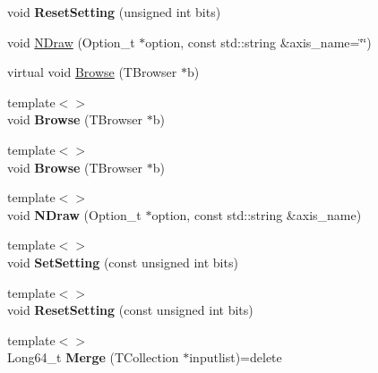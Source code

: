 \begin{DoxyCompactItemize}
void {\bfseries Reset\+Setting} (unsigned int bits)
\item 
void \mbox{\hyperlink{classQn_1_1DataContainer_a146d918368c9ab5273e223fac3bcedf1}{N\+Draw}} (Option\+\_\+t $\ast$option, const std\+::string \&axis\+\_\+name=\char`\"{}\char`\"{})
\item 
virtual void \mbox{\hyperlink{classQn_1_1DataContainer_acb108bdec1e5d316e0b8504546a961c4}{Browse}} (T\+Browser $\ast$b)
\item 
\mbox{\label{classQn_1_1DataContainer_aab04c45c30d45f97b0d14fdf77b7e027}} 
{\footnotesize template$<$$>$ }\\void {\bfseries Browse} (T\+Browser $\ast$b)
\item 
\mbox{\label{classQn_1_1DataContainer_aa4a6b4892e6f6355e4eccc3676fb0398}} 
{\footnotesize template$<$$>$ }\\void {\bfseries Browse} (T\+Browser $\ast$b)
\item 
\mbox{\label{classQn_1_1DataContainer_a66d138be93bbaed9617de46d0cb32505}} 
{\footnotesize template$<$$>$ }\\void {\bfseries N\+Draw} (Option\+\_\+t $\ast$option, const std\+::string \&axis\+\_\+name)
\item 
\mbox{\label{classQn_1_1DataContainer_a33c502bca3a71804831f2a1dff0951b0}} 
{\footnotesize template$<$$>$ }\\void {\bfseries Set\+Setting} (const unsigned int bits)
\item 
\mbox{\label{classQn_1_1DataContainer_ab9bb103e9b8ecded19d30979809b08a3}} 
{\footnotesize template$<$$>$ }\\void {\bfseries Reset\+Setting} (const unsigned int bits)
\item 
\mbox{\label{classQn_1_1DataContainer_a823ec9f69fcbbd4af4b31d8866806c25}} 
{\footnotesize template$<$$>$ }\\Long64\+\_\+t {\bfseries Merge} (T\+Collection $\ast$inputlist)=delete
\item 
\mbox{\label{classQn_1_1DataContainer_a76da5955d2884b691edd5afce6d3a531}} 

\end{DoxyCompactItemize}
